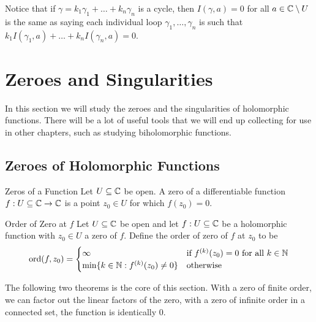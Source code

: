 \documentclass[a4paper]{article}
\begin{document}
Notice that if $\gamma=k_1\gamma_1+\dots+k_n\gamma_n$ is a cycle, then $I(\gamma,a)=0$ for all $a\in\mathbb{C}\setminus U$ is the same as saying each individual loop $\gamma_1,\dots,\gamma_n$ is such that $k_1I(\gamma_1,a)+\dots+k_nI(\gamma_n,a)=0$. 

\pagebreak
\section{Zeroes and Singularities}
In this section we will study the zeroes and the singularities of holomorphic functions. There will be a lot of useful tools that we will end up collecting for use in other chapters, such as studying biholomorphic functions. 

\subsection{Zeroes of Holomorphic Functions}
\begin{defn}{Zeros of a Function}{} Let $U\subseteq\mathbb{C}$ be open. A zero of a differentiable function $f:U\subseteq\mathbb{C}\to\mathbb{C}$ is a point $z_0\in U$ for which $f(z_0)=0$. 
\end{defn}

\begin{defn}{Order of Zero at $f$}{} Let $U\subseteq\mathbb{C}$ be open and let $f:U\subseteq\mathbb{C}$ be a holomorphic function with $z_0\in U$ a zero of $f$. Define the order of zero of $f$ at $z_0$ to be $$\operatorname{ord}(f,z_0)=\begin{cases}
\infty & \text{if $f^{(k)}(z_0)=0$} \text{ for all $k\in\mathbb{N}$}\\
\min\{k\in\mathbb{N}:f^{(k)}(z_0)\neq0\} & \text{otherwise}
\end{cases}$$
\end{defn}

The following two theorems is the core of this section. With a zero of finite order, we can factor out the linear factors of the zero, with a zero of infinite order in a connected set, the function is identically $0$. 
\end{document}
